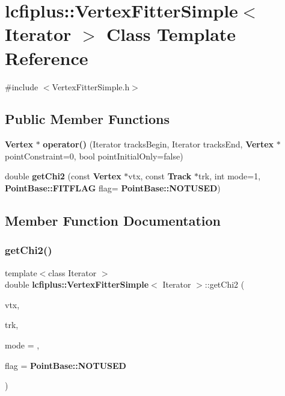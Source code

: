 \section{lcfiplus\+:\+:Vertex\+Fitter\+Simple$<$ Iterator $>$ Class Template Reference}
\label{classlcfiplus_1_1VertexFitterSimple}


{\ttfamily \#include $<$Vertex\+Fitter\+Simple.\+h$>$}

\subsection*{Public Member Functions}
\begin{DoxyCompactItemize}
\item 
\textbf{ Vertex} $\ast$ \textbf{ operator()} (Iterator tracks\+Begin, Iterator tracks\+End, \textbf{ Vertex} $\ast$point\+Constraint=0, bool point\+Initial\+Only=false)
\item 
double \textbf{ get\+Chi2} (const \textbf{ Vertex} $\ast$vtx, const \textbf{ Track} $\ast$trk, int mode=1, \textbf{ Point\+Base\+::\+F\+I\+T\+F\+L\+AG} flag=\textbf{ Point\+Base\+::\+N\+O\+T\+U\+S\+ED})
\end{DoxyCompactItemize}


\subsection{Member Function Documentation}
\mbox{\label{classlcfiplus_1_1VertexFitterSimple_a4f2e79e62de14a322f54371d25b539eb}} 
\subsubsection{get\+Chi2()}
{\footnotesize\ttfamily template$<$class Iterator $>$ \\
double \textbf{ lcfiplus\+::\+Vertex\+Fitter\+Simple}$<$ Iterator $>$\+::get\+Chi2 (\begin{DoxyParamCaption}\item[{const \textbf{ Vertex} $\ast$}]{vtx,  }\item[{const \textbf{ Track} $\ast$}]{trk,  }\item[{int}]{mode = {},  }\item[{\textbf{ Point\+Base\+::\+F\+I\+T\+F\+L\+AG}}]{flag = {\ttfamily \textbf{ Point\+Base\+::\+N\+O\+T\+U\+S\+ED}} }\end{DoxyParamCaption})\hspace{0.3cm}{\ttfamily [inline]}}



